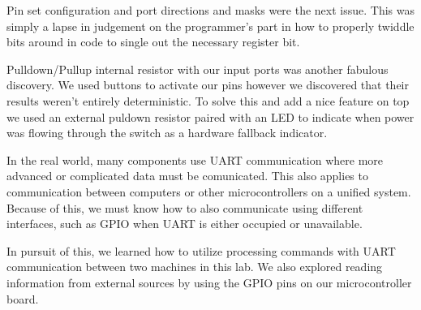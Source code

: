 \documentclass[letterpaper,11pt]{texMemo} %
\begin{document}
    Pin set configuration and port directions and masks were the next issue. This was simply a lapse in judgement
on the programmer's part in how to properly twiddle bits around in code to single out the necessary register bit.

    Pulldown/Pullup internal resistor with our input ports was another fabulous discovery. We used buttons to 
activate our pins however we discovered that their results weren't entirely deterministic. To solve this and add
a nice feature on top we used an external puldown resistor paired with an LED to indicate when power was flowing
through the switch as a hardware fallback indicator.

    In the real world, many components use UART communication where more advanced or complicated data must be 
comunicated. This also applies to communication between computers or other microcontrollers on a unified system.
Because of this, we must know how to also communicate using different interfaces, such as GPIO when UART is either
occupied or unavailable. 

    In pursuit of this, we learned how to utilize processing commands with UART communication between two 
machines in this lab. We also explored reading information from external sources by using the GPIO pins 
on our microcontroller board.


\newpage
\end{document}
